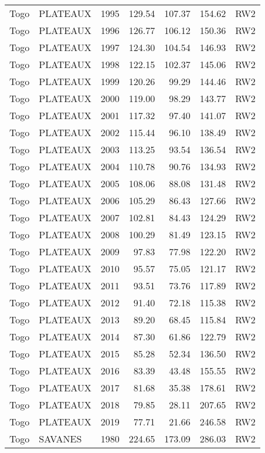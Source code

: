 \begin{longtable}{lllrrrl}
  Togo & PLATEAUX & 1995 & 129.54 & 107.37 & 154.62 & RW2 \\ 
  Togo & PLATEAUX & 1996 & 126.77 & 106.12 & 150.36 & RW2 \\ 
  Togo & PLATEAUX & 1997 & 124.30 & 104.54 & 146.93 & RW2 \\ 
  Togo & PLATEAUX & 1998 & 122.15 & 102.37 & 145.06 & RW2 \\ 
  Togo & PLATEAUX & 1999 & 120.26 & 99.29 & 144.46 & RW2 \\ 
  Togo & PLATEAUX & 2000 & 119.00 & 98.29 & 143.77 & RW2 \\ 
  Togo & PLATEAUX & 2001 & 117.32 & 97.40 & 141.07 & RW2 \\ 
  Togo & PLATEAUX & 2002 & 115.44 & 96.10 & 138.49 & RW2 \\ 
  Togo & PLATEAUX & 2003 & 113.25 & 93.54 & 136.54 & RW2 \\ 
  Togo & PLATEAUX & 2004 & 110.78 & 90.76 & 134.93 & RW2 \\ 
  Togo & PLATEAUX & 2005 & 108.06 & 88.08 & 131.48 & RW2 \\ 
  Togo & PLATEAUX & 2006 & 105.29 & 86.43 & 127.66 & RW2 \\ 
  Togo & PLATEAUX & 2007 & 102.81 & 84.43 & 124.29 & RW2 \\ 
  Togo & PLATEAUX & 2008 & 100.29 & 81.49 & 123.15 & RW2 \\ 
  Togo & PLATEAUX & 2009 & 97.83 & 77.98 & 122.20 & RW2 \\ 
  Togo & PLATEAUX & 2010 & 95.57 & 75.05 & 121.17 & RW2 \\ 
  Togo & PLATEAUX & 2011 & 93.51 & 73.76 & 117.89 & RW2 \\ 
  Togo & PLATEAUX & 2012 & 91.40 & 72.18 & 115.38 & RW2 \\ 
  Togo & PLATEAUX & 2013 & 89.20 & 68.45 & 115.84 & RW2 \\ 
  Togo & PLATEAUX & 2014 & 87.30 & 61.86 & 122.79 & RW2 \\ 
  Togo & PLATEAUX & 2015 & 85.28 & 52.34 & 136.50 & RW2 \\ 
  Togo & PLATEAUX & 2016 & 83.39 & 43.48 & 155.55 & RW2 \\ 
  Togo & PLATEAUX & 2017 & 81.68 & 35.38 & 178.61 & RW2 \\ 
  Togo & PLATEAUX & 2018 & 79.85 & 28.11 & 207.65 & RW2 \\ 
  Togo & PLATEAUX & 2019 & 77.71 & 21.66 & 246.58 & RW2 \\ 
  Togo & SAVANES & 1980 & 224.65 & 173.09 & 286.03 & RW2 \\ 

\end{longtable}
